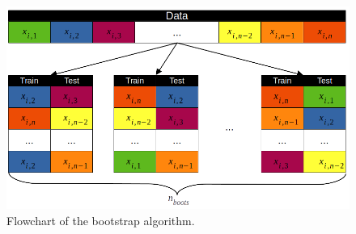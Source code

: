 \begin{figure}[H]
    \centering
    \includegraphics[width=1\linewidth]{Images/bootstrap_diagram.png}
    \caption{Flowchart of the bootstrap algorithm.}
    \label{fig:bootstrap_algorithm}
\end{figure}

